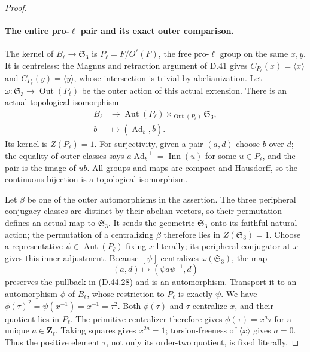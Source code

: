 \begin{proof}
\paragraph{The entire pro-\(\ell\) pair and its exact outer comparison.}
The kernel of \(B_\ell\to\mathfrak S_3\) is
\(P_\ell=F/O^\ell(F)\), the free pro-\(\ell\) group on the
same \(x,y\). It is centreless: the Magnus and retraction
argument of D.41 gives
\(C_{P_\ell}(x)=\langle x\rangle\) and
\(C_{P_\ell}(y)=\langle y\rangle\), whose intersection is
trivial by abelianization.
Let
\(\omega:\mathfrak S_3\to\operatorname{Out}(P_\ell)\)
be the outer action of this actual extension.
There is an actual topological isomorphism
\[
 \begin{split}
 B_\ell&\longrightarrow
       \operatorname{Aut}(P_\ell)
          \mathbin{\times_{\operatorname{Out}(P_\ell)}}
                   \mathfrak S_3,\\
 b&\longmapsto(\operatorname{Ad}_b,\bar b).
 \end{split}
 \tag{D.44.28}
\]
Its kernel is \(Z(P_\ell)=1\).
For surjectivity, given a pair \((a,d)\) choose \(b\) over
\(d\); the equality of outer classes says
\(a\operatorname{Ad}_b^{-1}=\operatorname{Inn}(u)\) for
some \(u\in P_\ell\), and the pair is the image of \(ub\).
All groups and maps are compact and Hausdorff, so the
continuous bijection is a topological isomorphism.

Let \(\beta\) be one of the outer automorphisms in the
assertion. The three peripheral conjugacy classes are
distinct by their abelian vectors, so their permutation
defines an actual map to \(\mathfrak S_3\).
It sends the geometric \(\mathfrak S_3\) onto its faithful
natural action; the permutation of a centralizing
\(\beta\) therefore lies in \(Z(\mathfrak S_3)=1\).
Choose a representative
\(\psi\in\operatorname{Aut}(P_\ell)\) fixing \(x\)
literally; its peripheral conjugator at \(x\) gives this
inner adjustment. Because \([\psi]\) centralizes
\(\omega(\mathfrak S_3)\), the map
\[
                 (a,d)\longmapsto
                       (\psi a\psi^{-1},d)
 \tag{D.44.29}
\]
preserves the pullback in \textup{(D.44.28)} and is an
automorphism. Transport it to an automorphism \(\phi\)
of \(B_\ell\), whose restriction to \(P_\ell\) is
exactly \(\psi\).
We have
\(\phi(\tau)^2=\psi(x^{-1})=x^{-1}=\tau^2\).
Both \(\phi(\tau)\) and \(\tau\) centralize \(x\),
and their quotient lies in \(P_\ell\).
The primitive centralizer therefore gives
\(\phi(\tau)=x^a\tau\) for a unique \(a\in\mathbf Z_\ell\).
Taking squares gives \(x^{2a}=1\); torsion-freeness of
\(\langle x\rangle\) gives \(a=0\).
Thus the positive element \(\tau\), not only its
order-two quotient, is fixed literally.


\end{proof}
